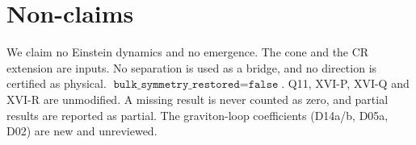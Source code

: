 \section*{Non-claims}
We claim no Einstein dynamics and no emergence. The cone and the CR extension are inputs. No separation is used as a bridge, and no direction is certified as physical. $\texttt{bulk\_symmetry\_restored}=\texttt{false}$. Q11, XVI-P, XVI-Q and XVI-R are unmodified. A missing result is never counted as zero, and partial results are reported as partial. The graviton-loop coefficients (D14a/b, D05a, D02) are new and unreviewed.

